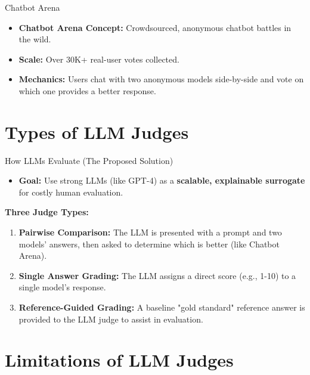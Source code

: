 \documentclass[10pt]{beamer}
\begin{document}
\begin{frame}{Chatbot Arena}
  \begin{itemize}
    \item \textbf{Chatbot Arena Concept:} Crowdsourced, anonymous chatbot battles in the wild.
    \item \textbf{Scale:} Over 30K+ real-user votes collected.
    \item \textbf{Mechanics:} Users chat with two anonymous models side-by-side and vote on which one provides a better response.
  \end{itemize}
  \vspace{0.3cm}
\end{frame}

\section{Types of LLM Judges}

\begin{frame}{How LLMs Evaluate (The Proposed Solution)}
  \begin{itemize}
    \item \textbf{Goal:} Use strong LLMs (like GPT-4) as a \textbf{scalable, explainable surrogate} for costly human evaluation.
  \end{itemize}
  \vspace{0.2cm}
  \textbf{Three Judge Types:} 
  \begin{enumerate}
      \item \textbf{Pairwise Comparison:} The LLM is presented with a prompt and two models' answers, then asked to determine which is better (like Chatbot Arena).
      \item \textbf{Single Answer Grading:} The LLM assigns a direct score (e.g., 1-10) to a single model's response.
      \item \textbf{Reference-Guided Grading:} A baseline "gold standard" reference answer is provided to the LLM judge to assist in evaluation.
  \end{enumerate}
\end{frame}

\section{Limitations of LLM Judges}
\end{document}
